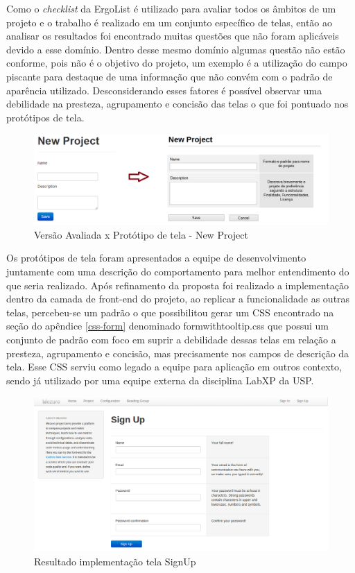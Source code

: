 Como o \textit{checklist} da ErgoList é utilizado para avaliar todos os âmbitos de um projeto e o trabalho é realizado em um conjunto específico de telas, então ao analisar os resultados foi encontrado muitas questões que não foram aplicáveis devido a esse domínio. Dentro desse mesmo domínio algumas questão não estão conforme, pois não é o objetivo do projeto, um exemplo é a utilização do campo piscante para destaque de uma informação que não convém com o padrão de aparência utilizado. Desconsiderando esses fatores é possível observar uma debilidade na presteza, agrupamento e concisão das telas o que foi pontuado nos protótipos de tela.

\graphicspath{{figuras/}}
\begin{figure}[H]
\centering
\includegraphics[width=1.0\textwidth]{PrototipoNewProject}
\caption{Versão Avaliada x Protótipo de tela - New Project}
\label{parallel-coordinate}
\end{figure}

Os protótipos de tela foram apresentados a equipe de desenvolvimento juntamente com uma descrição do comportamento para melhor entendimento do que seria realizado. Após refinamento da proposta foi realizado a implementação dentro da camada de front-end do projeto, ao replicar a funcionalidade as outras telas, percebeu-se um padrão o que possibilitou gerar um CSS encontrado na seção do apêndice \ref{css-form} denominado formwithtooltip.css que possui um conjunto de padrão com foco em suprir a debilidade dessas telas em relação a presteza, agrupamento e concisão, mas precisamente nos campos de descrição da tela. Esse CSS serviu como legado a equipe para aplicação em outros contexto, sendo já utilizado por uma equipe externa da disciplina LabXP da USP.

\graphicspath{{figuras/}}
\begin{figure}[H]
\centering
\includegraphics[width=1.0\textwidth]{TelaSignUp}
\caption{Resultado implementação tela SignUp}
\label{parallel-coordinate}
\end{figure}

